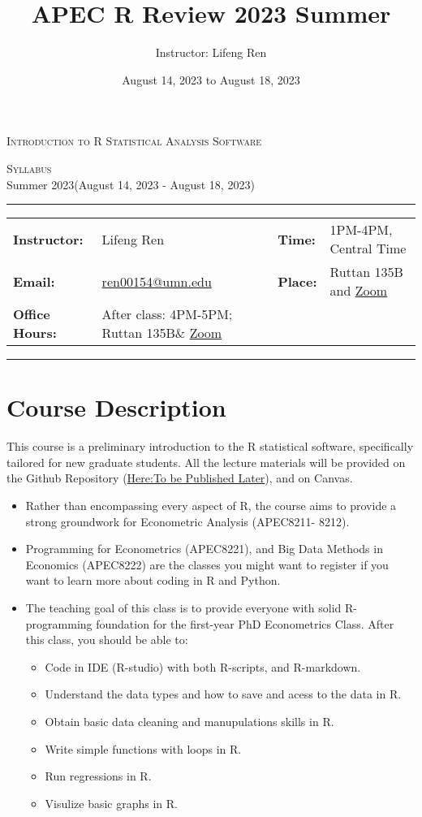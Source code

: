 \documentclass{article}
\title{APEC R Review 2023 Summer}
\author{Instructor: Lifeng Ren}
\date{August 14, 2023 to August 18, 2023}
\begin{document}
\thispagestyle{plain}
\begin{center}
{\LARGE \textsc{Introduction to R Statistical Analysis Software}}
\end{center}
\begin{center}
\large \textsc{Syllabus}\\
Summer 2023(August 14, 2023 - August 18, 2023)
\end{center}

\begin{center}
\rule{6.5in}{0.4pt}
\begin{tabular}{llll}
\textbf{Instructor:} & Lifeng Ren &   \textbf{Time:} & 1PM-4PM, Central Time \\
\textbf{Email:} &\href{mailto:ren00154@umn.edu}{ren00154@umn.edu}  &   \textbf{Place:} & Ruttan 135B and \href{https://umn.zoom.us/j/96218181588?pwd=ZFVrdWQ0bkZyb2N2Wkdwc0JnUk9CQT09}{Zoom}\\
\textbf{Office Hours:} & After class: 4PM-5PM; Ruttan 135B\& \href{https://umn.zoom.us/j/96218181588?pwd=ZFVrdWQ0bkZyb2N2Wkdwc0JnUk9CQT09}{Zoom}&
\end{tabular}
\rule{6.5in}{0.4pt}
\end{center}

\section*{Course Description}
This course is a preliminary introduction to the R statistical software, specifically tailored for new graduate students. 
All the lecture materials will be provided on the Github Repository (\href{https://github.com/lfr00154/R-review2023}{Here:To be Published Later}), and on Canvas. 
\begin{itemize}
    \item Rather than encompassing every aspect of R, the course aims to provide a strong groundwork for Econometric Analysis (APEC8211- 8212). 
    \item Programming for Econometrics (APEC8221), and Big Data Methods in Economics (APEC8222) are the classes you might want to register if you want to learn more about coding in R and Python. 
    \item The teaching goal of this class is to provide everyone with solid R-programming foundation for the first-year PhD Econometrics Class. After this class, you should be able to:
    \begin{itemize}
        \item Code in IDE (R-studio) with both R-scripts, and R-markdown.
        \item Understand the data types and how to save and acess to the data in R.
        \item Obtain basic data cleaning and manupulations skills in R.
        \item Write simple functions with loops in R.
        \item Run regressions in R.
        \item Visulize basic graphs in R. 
    \end{itemize}
\end{itemize}
\end{document}
